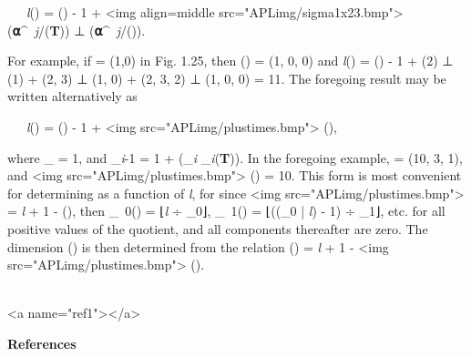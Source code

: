 {\par \ \ \ \textit{l}() =
\textit{\nu}() - 1 + <img align=middle src="APLimg/sigma1x23.bmp"> (\textbf{⍺}^{\textit{\ j}}/\textbf{\nu}(\textbf{T}))
⊥ (\textbf{⍺}^{\textit{\ j}}/()).


\par For example, if 
 = (1,0) in Fig. 1.25, then 
() = (1, 0, 0) and
\textit{l}() = \textit{\nu}() - 1 + (2) ⊥ (1) + (2, 3) ⊥ (1, 0) + (2, 3, 2) ⊥ (1, 0, 0) = 11. The foregoing result may be written alternatively as

\par \ \ \ \textit{l}() = \textit{\nu}() - 1 +  <img src="APLimg/plustimes.bmp"> (),

\par where _{\textit{\nu}} = 1, and _{\textit{i}-1} = 1 + (_{\textit{i}} \times 
\textbf{\nu}_{\textit{i}}(\textbf{T})). In the foregoing example,
 = (10, 3, 1), and 
 <img src="APLimg/plustimes.bmp"> 
() = 10. This form is most convenient for determining  as a function of \textit{l}, for since 
 <img src="APLimg/plustimes.bmp"> 
 = \textit{l} + 1 - 
\textit{\nu}(), then 
_{\ 0}() = 
⌊\textit{l} ÷ 
_{0}⌋,
_{\ 1}() = 
⌊((_{0} | \textit{l}) - 1)
÷ _{1}⌋, etc. for all positive values of the quotient, and all components thereafter are zero. The dimension \textit{\nu}() is then determined from the relation 
\textit{\nu}() = \textit{l} + 1 - 
 <img src="APLimg/plustimes.bmp"> 
().
\\\ 



<a name="ref1"></a>
\par \textbf{References}

}
